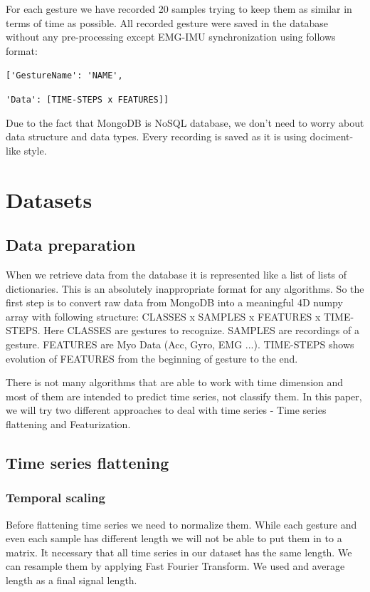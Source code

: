 \documentclass[conference,compsoc]{IEEEtran}
\begin{document}
For each gesture we have recorded 20 samples trying to keep them as similar in terms of time as possible. All recorded gesture were saved in the database without any pre-processing except EMG-IMU synchronization using follows format:

\verb|['GestureName': 'NAME',| 

\verb|'Data': [TIME-STEPS x FEATURES]]|

Due to the fact that MongoDB is NoSQL database, we don't need to worry about data structure and data types. Every recording is saved as it is using dociment-like style.

\section{Datasets}
\subsection{Data preparation}
When we retrieve data from the database it is represented like a list of lists of dictionaries. This is an absolutely inappropriate format for any algorithms. So the first step is to convert raw data from MongoDB into a meaningful 4D numpy array with following structure: CLASSES x SAMPLES x FEATURES x TIME-STEPS. Here CLASSES are gestures to recognize. SAMPLES are recordings of a gesture. FEATURES are Myo Data (Acc, Gyro, EMG ...). TIME-STEPS shows evolution of FEATURES from the beginning of gesture to the end.

There is not many algorithms that are able to work with time dimension and most of them are intended to predict time series, not classify them. In this paper, we will try two different approaches to deal with time series - Time series flattening and Featurization. 

\subsection{Time series flattening }
\subsubsection{Temporal scaling}

Before flattening time series we need to normalize them. While each gesture and even each sample has different length we will not be able to put them in to a matrix. It necessary that all time series in our dataset has the same length. We can resample them by applying Fast Fourier Transform. We used and average length as a final signal length.
\end{document}
